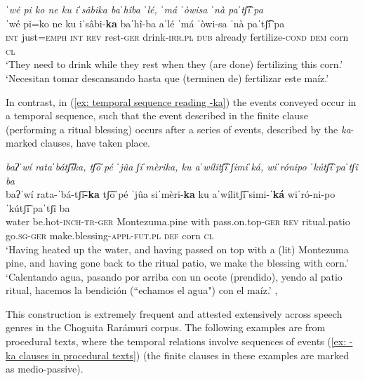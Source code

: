     \textit{ˈwé pi ko ne ku iˈsâbika baˈhîba ˈlé, ˈmá ˈòwisa ˈnà paˈtʃ͡í pa}\\
    \gll    ˈwé pi=ko ne ku iˈsâbi-\textbf{ka} baˈhî-ba aˈlé ˈmá ˈòwi-sa ˈnà paˈtʃ͡í pa\\
            \textsc{int} just=\textsc{emph} \textsc{int} \textsc{rev} rest-{\textsc{ger}} drink-\textsc{irr.pl} \textsc{dub} already fertilize-\textsc{cond} \textsc{dem} corn \textsc{cl}\\
    \glt    `They need to drink while they rest when they (are done) fertilizing this corn.'\\
    \glt     `Necesitan tomar descansando hasta que (terminen de) fertilizar este maíz.’ \\

\z

In contrast, in (\ref{ex: temporal sequence reading -ka}) the events conveyed occur in a temporal sequence, such that the event described in the finite clause (performing a ritual blessing) occurs after a series of events, described by the \textit{ka}-marked clauses, have taken place.

\ea\label{ex: temporal sequence reading -ka}

    \textit{baʔˈwí rataˈbátʃ͡ika, tʃ͡oˈpé ˈjûa ʃiˈmèrika, ku aˈwílitʃ͡i ʃimiˈká, wiˈrónipo ˈkútʃ͡i paˈtʃî ba}\\
    \gll    baʔˈwí rata-ˈbá-tʃ͡i\textbf{-ka} tʃ͡oˈpé ˈjûa siˈmèri-\textbf{ka} ku aˈwílitʃ͡i simi-\textbf{ˈká} wiˈró-ni-po ˈkútʃ͡i paˈtʃî ba\\
            water be.hot-\textsc{inch-tr-{ger}} Montezuma.pine with pass.on.top-\textsc{{ger}} \textsc{rev} ritual.patio go.\textsc{sg-{ger}} make.blessing-\textsc{appl-fut.pl} \textsc{def} corn \textsc{cl}\\
    \glt    `Having heated up the water, and having passed on top with a (lit) Montezuma pine, and having gone back to the ritual patio, we make the blessing with corn.'\\
    \glt    `Calentando agua, pasando por arriba con un ocote (prendido), yendo al patio ritual, hacemos la bendición (``echamos el agua") con el maíz.'    , \\

\z

This construction is extremely frequent and attested extensively across speech genres in the Choguita Rarámuri corpus. The following examples are from procedural texts, where the temporal relations involve sequences of events (\ref{ex: -ka clauses in procedural texts}) (the finite clauses in these examples are marked as medio-passive).

